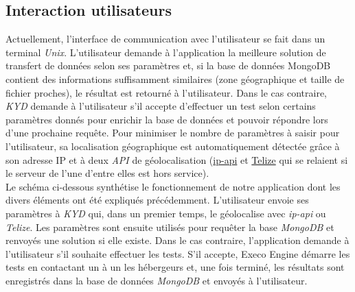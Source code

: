 \documentclass[10pt]{article}
\begin{document}
\subsection{Interaction utilisateurs}

Actuellement, l'interface de communication avec l'utilisateur se fait dans un
terminal \textit{Unix}. L'utilisateur demande à l'application la meilleure
solution de transfert de données selon ses paramètres et, si la base de données
MongoDB contient des informations suffisamment similaires (zone géographique et
taille de fichier proches), le résultat est retourné à l'utilisateur. Dans le
cas contraire, \textit{KYD} demande à l'utilisateur s'il accepte d'effectuer un
test selon certains paramètres donnés pour enrichir la base de données et
pouvoir répondre lors d'une prochaine requête. Pour minimiser le nombre de
paramètres à saisir pour l'utilisateur, sa localisation géographique est
automatiquement détectée grâce à son adresse IP et à deux \textit{API} de
géolocalisation (\href{http://ip-api.com/docs/api:json}{ip-api} et
\href{http://www.telize.com/}{Telize} qui se relaient si le serveur de l'une
d'entre elles est hors service).\\

Le schéma ci-dessous synthétise le fonctionnement de notre application dont les
divers éléments ont été expliqués précédemment. L'utilisateur envoie ses
paramètres à \textit{KYD} qui, dans un premier temps, le géolocalise avec
\textit{ip-api} ou \textit{Telize}. Les paramètres sont ensuite utilisés pour
requêter la base \textit{MongoDB} et renvoyés une solution si elle existe. Dans
le cas contraire, l'application demande à l'utilisateur s'il souhaite effectuer
les tests. S'il accepte, Execo Engine démarre les tests en contactant un à un
les hébergeurs et, une fois terminé, les résultats sont enregistrés dans la
base de données \textit{MongoDB} et envoyés à l'utilisateur.
\end{document}
